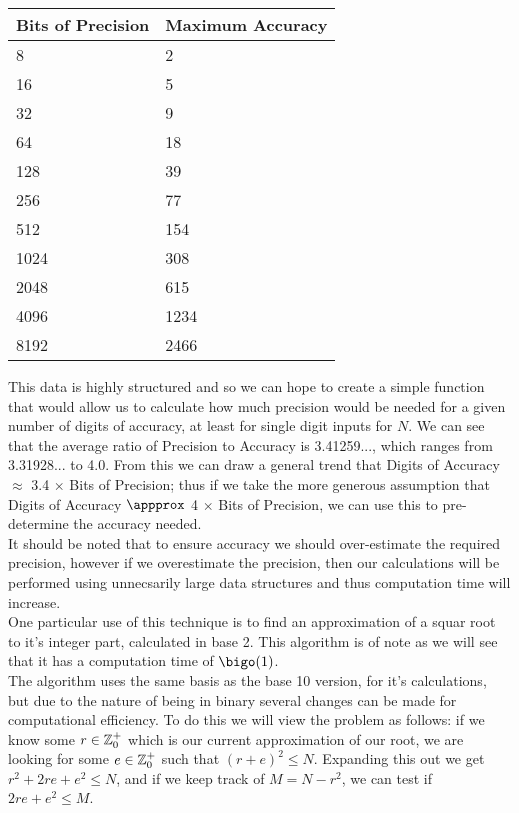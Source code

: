 \begin{center}
\begin{tabular}{|p{3cm}|p{3cm}|}
\hline
Bits of Precision & Maximum Accuracy\\ \hline
8 & 2 \\ \hline
16 & 5 \\ \hline
32 & 9 \\ \hline
64 & 18 \\ \hline
128 & 39 \\ \hline
256 & 77 \\ \hline
512 & 154 \\ \hline
1024 & 308 \\ \hline
2048 & 615 \\ \hline
4096 & 1234 \\ \hline
8192 & 2466 \\ \hline
\end{tabular}
\end{center}

This data is highly structured and so we can hope to create a simple function that would allow us to calculate how much precision would be needed for a given number of digits of accuracy, at least for single digit inputs for \(N\). We can see that the average ratio of Precision to Accuracy is 3.41259..., which ranges from 3.31928... to 4.0. From this we can draw a general trend that Digits of Accuracy \(\approx\) 3.4 \(\times\) Bits of Precision; thus if we take the more generous assumption that Digits of Accuracy \(\appprox\) 4 \(\times\) Bits of Precision, we can use this to pre-determine the accuracy needed.\\

It should be noted that to ensure accuracy we should over-estimate the required precision, however if we overestimate the precision, then our calculations will be performed using unnecsarily large data structures and thus computation time will increase.\\

One particular use of this technique is to find an approximation of a squar root to it's integer part, calculated in base 2. This algorithm is of note as we will see that it has a computation time of \(\bigo(1)\).\\

The algorithm uses the same basis as the base 10 version, for it's calculations, but due to the nature of being in binary several changes can be made for computational efficiency. To do this we will view the problem as follows: if we know some \(r \in \mathbb{Z}^+_0\) which is our current approximation of our root, we are looking for some \(e \in \mathbb{Z}^+_0\) such that \((r+e)^2 \le N\). Expanding this out we get \(r^2 + 2re + e^2 \le N\), and if we keep track of \(M = N - r^2\), we can test if \(2re + e^2 \le M\).\\

